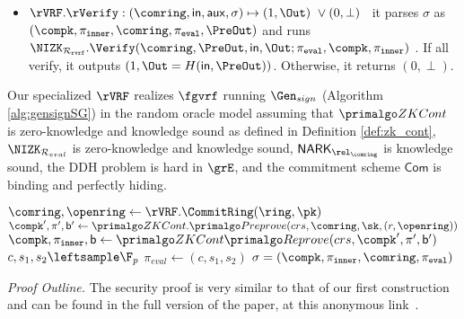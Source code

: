 \begin{itemize}
	\item  $\rVRF.\rVerify : (\comring,\msg,\aux,\sigma) \mapsto (1,\Out) \,\, \lor (0,\perp)$ \,
	it parses $\sigma$ as $(\compk, \allowbreak \pi_{\mathtt{inner}}, \allowbreak \comring, \allowbreak \pieval, \PreOut)$ and runs  $\NIZK_{\relrvrf}.\Verify(\comring, \PreOut, \msg, \Out; \pieval,\compk, \allowbreak \pi_{\mathtt{inner}})$  . If all verify, it outputs $ (1,\Out = H(\msg,\PreOut)) $. Otherwise, it returns $ (0,\perp) $.
\end{itemize}




\begin{theorem}\label{thm:rvrfspecial}
	Our specialized $ \rVRF $   realizes $ \fgvrf $ running $ \Gen_{sign} $ (Algorithm \ref{alg:gensignSG}) \cite{canetti1,canetti2} in the random oracle model assuming that $\ZKCont $ is zero-knowledge and knowledge sound as defined in Definition \ref{def:zk_cont}, $ \NIZK_{\mathcal{R}_{eval}} $ is zero-knowledge and knowledge sound, $ \NARK_{\relcomring} $ is knowledge sound, the DDH problem is hard in $ \grE  $, %
	and the commitment scheme $ \mathsf{Com} $ is binding and perfectly hiding. 
\end{theorem}
\begin{algorithm}
	\eprint{}{\scriptsize}
	\caption{$\Gen_{sign}(\ring, \sk= (x,r),\pk,\aux,\msg)$}
	\label{alg:gensignSG}	 	
	\begin{algorithmic}[1]
		\State $ \comring, \openring \leftarrow \rVRF.\CommitRing(\ring, \pk) $
		\State $ \compk', \pi', \openpk' \leftarrow \ZKCont.\Preprove(crs, \comring,\sk,(r,\openring)) $
		\State $ \compk, \pi_{\mathtt{inner}}, \openpk \leftarrow \ZKCont\Reprove(crs, \compk',\pi',\openpk') $ 
		\State $ c,s_1, s_2 \leftsample \F_p $
		\State $ \pi_{eval}  \leftarrow (c,s_1, s_2)$		
		\State\Return$ \sigma = (\compk, \pi_{\mathtt{inner}},\comring, \pieval) $
	\end{algorithmic}
	
\end{algorithm}

\noindent \textit{Proof Outline.}  The security proof is very similar to that of our first construction
and can be found in the full version of the paper, at this anonymous link~\cite{anonymous}.




